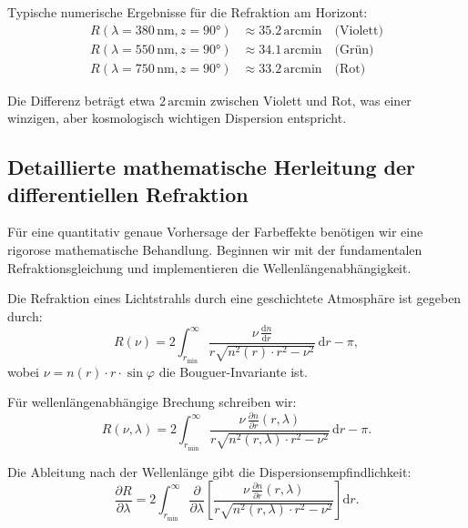 \documentclass[12pt,a4paper]{article}
\providecommand{\ang}[1]{\ensuremath{#1\,\mathrm{arcmin}}}
\begin{document}
Typische numerische Ergebnisse für die Refraktion am Horizont:
\begin{equation}
	\begin{aligned}
		R(\lambda = 380\,\mathrm{nm}, z=90°) &\approx 35.2\,\mathrm{arcmin} \quad \text{(Violett)}\\
		R(\lambda = 550\,\mathrm{nm}, z=90°) &\approx 34.1\,\mathrm{arcmin} \quad \text{(Grün)}\\
		R(\lambda = 750\,\mathrm{nm}, z=90°) &\approx 33.2\,\mathrm{arcmin} \quad \text{(Rot)}
	\end{aligned}
	\label{eq:R_lambda_horz_beispiel}
\end{equation}

Die Differenz beträgt etwa $\ang{2}$ zwischen Violett und Rot,
was einer winzigen, aber kosmologisch wichtigen Dispersion entspricht.

\subsection{Detaillierte mathematische Herleitung der differentiellen Refraktion}
\label{subsec:math_herleitung}

Für eine quantitativ genaue Vorhersage der Farbeffekte benötigen wir
eine rigorose mathematische Behandlung. Beginnen wir mit der fundamentalen
Refraktionsgleichung und implementieren die Wellenlängenabhängigkeit.

Die Refraktion eines Lichtstrahls durch eine geschichtete Atmosphäre ist gegeben durch:
\begin{equation}
	R(\nu) = 2 \int_{r_{\min}}^{\infty} 
	\frac{\nu \, \frac{\mathrm{d}n}{\mathrm{d}r}}{r \sqrt{n^2(r) \cdot r^2 - \nu^2}} \, \mathrm{d}r - \pi,
	\label{eq:R_fundamental}
\end{equation}
wobei $\nu = n(r) \cdot r \cdot \sin \varphi$ die Bouguer-Invariante ist.

Für wellenlängenabhängige Brechung schreiben wir:
\begin{equation}
	R(\nu, \lambda) = 2 \int_{r_{\min}}^{\infty} 
	\frac{\nu \, \frac{\partial n}{\partial r}(r, \lambda)}{r \sqrt{n^2(r, \lambda) \cdot r^2 - \nu^2}} \, \mathrm{d}r - \pi.
	\label{eq:R_lambda_fundamental}
\end{equation}

Die Ableitung nach der Wellenlänge gibt die Dispersionsempfindlichkeit:
\begin{equation}
	\frac{\partial R}{\partial \lambda} = 2 \int_{r_{\min}}^{\infty} 
	\frac{\partial}{\partial \lambda}\left[\frac{\nu \, \frac{\partial n}{\partial r}(r, \lambda)}{r \sqrt{n^2(r, \lambda) \cdot r^2 - \nu^2}}\right] \mathrm{d}r.
	\label{eq:dR_dlambda}
\end{equation}
\end{document}
